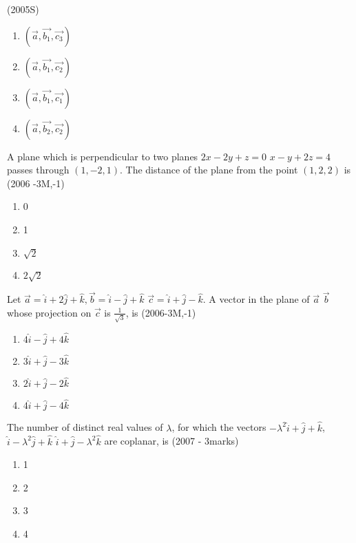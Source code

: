     \hfill{(2005S)}
    \begin{multicols}{2}
    \begin{enumerate}
    \item $(\vec{a}, \vec{b_1}, \vec{c_3})$
    \item $(\vec{a}, \vec{b_1}, \vec{c_2})$
    \item $(\vec{a}, \vec{b_1}, \vec{c_1})$
    \item $(\vec{a}, \vec{b_2}, \vec{c_2})$
    \end{enumerate}
    \end{multicols}
    \item A plane which is perpendicular to two planes $2x-2y+z=0$  $x-y+2z=4$ passes through $(1,-2,1)$. The distance of the plane from the point $(1,2,2)$ is
    \hfill{(2006 -3M,-1)}
    \begin{multicols}{2} 
    \begin{enumerate}
    \item 0
    \item 1
    \item $\sqrt{2}$
    \item $2\sqrt{2}$
    \end{enumerate}
    \end{multicols}
    \item Let $\vec{a} = \hat{i} + 2\hat{j} + \hat{k}, \vec{b} = \hat{i}-\hat{j}+\hat{k}$  $\vec{c}= \hat{i}+\hat{j}-\hat{k}$. A vector in the plane of $\vec{a}$  $\vec{b}$ whose projection on $\vec{c}$ is $\frac{1}{\sqrt{3}}$, is
    \hfill{(2006-3M,-1)}
    \begin{enumerate}
    \item $4\hat{i} - \hat{j} + 4\hat{k}$
    \item $3\hat{i} + \hat{j} - 3\hat{k}$
    \item $2\hat{i} + \hat{j} - 2\hat{k}$
    \item $4\hat{i} + \hat{j} - 4\hat{k}$
    \end{enumerate}
    \item The number of distinct real values of $\lambda$, for which the vectors $-\lambda^{2}\hat{i} + \hat{j} + \hat{k}$, $\hat{i} - \lambda^{2}\hat{j} + \hat{k}$  $\hat{i} + \hat{j} - \lambda^{2}\hat{k}$ are coplanar, is
    \hfill{(2007 - 3marks)}
    \begin{multicols}{2} 
    \begin{enumerate}
    \item 1
    \item 2
    \item 3
    \item 4
    \end{enumerate}
    \end{multicols}
